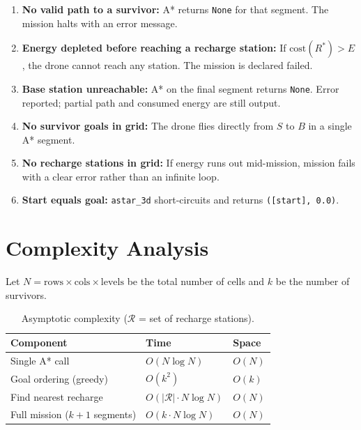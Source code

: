 \documentclass[12pt]{article}
\begin{document}
\begin{enumerate}
    \item \textbf{No valid path to a survivor:}
          A* returns \texttt{None} for that segment.
          The mission halts with an error message.

    \item \textbf{Energy depleted before reaching a recharge station:}
          If $\text{cost}(R^*) > E$, the drone cannot reach any station.
          The mission is declared failed.

    \item \textbf{Base station unreachable:}
          A* on the final segment returns \texttt{None}.
          Error reported; partial path and consumed energy are still output.

    \item \textbf{No survivor goals in grid:}
          The drone flies directly from $S$ to $B$ in a single A* segment.

    \item \textbf{No recharge stations in grid:}
          If energy runs out mid-mission, mission fails with a clear error
          rather than an infinite loop.

    \item \textbf{Start equals goal:}
          \texttt{astar\_3d} short-circuits and returns \texttt{([start], 0.0)}.
\end{enumerate}

\section{Complexity Analysis}

Let $N = \text{rows} \times \text{cols} \times \text{levels}$ be the total
number of cells and $k$ be the number of survivors.

\begin{table}[H]
\centering
\begin{tabular}{@{} l l l @{}}
\toprule
\textbf{Component}           & \textbf{Time}         & \textbf{Space} \\
\midrule
Single A* call               & $O(N \log N)$         & $O(N)$ \\
Goal ordering (greedy)       & $O(k^2)$              & $O(k)$ \\
Find nearest recharge        & $O(|\mathcal{R}| \cdot N \log N)$ & $O(N)$ \\
Full mission ($k+1$ segments)& $O(k \cdot N \log N)$ & $O(N)$ \\
\bottomrule
\end{tabular}
\caption{Asymptotic complexity ($\mathcal{R}$ = set of recharge stations).}
\end{table}
\end{document}
